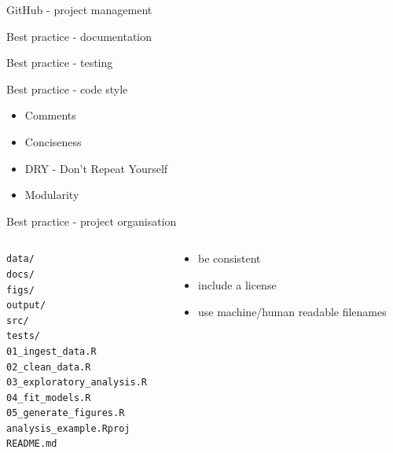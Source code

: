 \documentclass{beamer} %
\begin{document}
  \begin{frame}{GitHub - project management}
  \end{frame}

  \begin{frame}{Best practice - documentation}
  \end{frame}

  \begin{frame}{Best practice - testing}
  \end{frame}

  \begin{frame}{Best practice - code style}
    \pause
    \begin{itemize}
      \item Comments
      \item Conciseness
      \item DRY - Don't Repeat Yourself
      \item Modularity
    \end{itemize}
  \end{frame}

  \begin{frame}[fragile]{Best practice - project organisation}
    \begin{columns}
      \begin{column}{0.3\textwidth}
        \small
        \begin{verbatim}
data/
docs/
figs/
output/
src/
tests/
01_ingest_data.R
02_clean_data.R
03_exploratory_analysis.R
04_fit_models.R
05_generate_figures.R
analysis_example.Rproj
README.md\end{verbatim}
      \end{column}  
      \begin{column}{0.5\textwidth}
        \begin{itemize}
          \item be consistent
          \item include a license
          \item use machine/human readable filenames
        \end{itemize}
      \end{column}  
  \end{columns}
  \end{frame}

\end{document}
